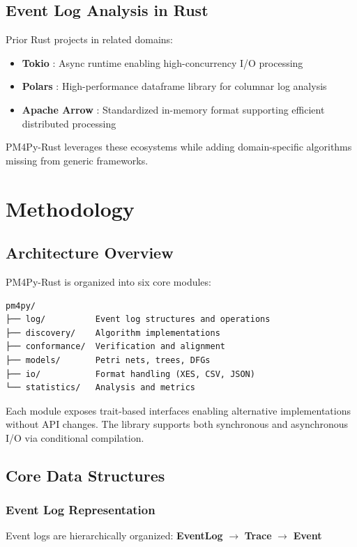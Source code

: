 \documentclass[11pt,twocolumn]{article}
\begin{document}
\subsection{Event Log Analysis in Rust}
Prior Rust projects in related domains:
\begin{itemize}
    \item \textbf{Tokio} \cite{tokio}: Async runtime enabling high-concurrency I/O processing
    \item \textbf{Polars} \cite{polars}: High-performance dataframe library for columnar log analysis
    \item \textbf{Apache Arrow} \cite{arrow2020}: Standardized in-memory format supporting efficient distributed processing
\end{itemize}

PM4Py-Rust leverages these ecosystems while adding domain-specific algorithms missing from generic frameworks.

\section{Methodology}
\label{sec:methodology}

\subsection{Architecture Overview}

PM4Py-Rust is organized into six core modules:

\begin{lstlisting}
pm4py/
├── log/          Event log structures and operations
├── discovery/    Algorithm implementations
├── conformance/  Verification and alignment
├── models/       Petri nets, trees, DFGs
├── io/           Format handling (XES, CSV, JSON)
└── statistics/   Analysis and metrics
\end{lstlisting}

Each module exposes trait-based interfaces enabling alternative implementations without API changes. The library supports both synchronous and asynchronous I/O via conditional compilation.

\subsection{Core Data Structures}

\subsubsection{Event Log Representation}
Event logs are hierarchically organized: \textbf{EventLog} $\rightarrow$ \textbf{Trace} $\rightarrow$ \textbf{Event}
\end{document}
